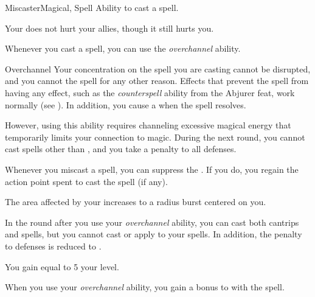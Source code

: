     \begin{feat}{Miscaster}{Magical, Spell}
        \featpre Ability to cast a spell.

         Your  does not hurt your allies, though it still hurts you.

         Whenever you cast a spell, you can use the \textit{overchannel} ability.
        \begin{ability}{Overchannel}
            Your concentration on the spell you are casting cannot be disrupted, and you cannot  the spell for any other reason.
            Effects that prevent the spell from having any effect, such as the \textit{counterspell} ability from the Abjurer feat, work normally (see ).
            In addition, you cause a  when the spell resolves.

            However, using this ability requires channeling excessive magical energy that temporarily limits your connection to magic.
            During the next round, you cannot cast spells other than , and you take a  penalty to all defenses.
        \end{ability}

         Whenever you miscast a spell, you can suppress the .
        If you do, you regain the action point spent to cast the spell (if any).

         The area affected by your  increases to a \areamed radius burst centered on you.

         In the round after you use your \textit{overchannel} ability, you can cast both cantrips and spells, but you cannot cast  or apply  to your spells.
        In addition, the penalty to defenses is reduced to .

         You gain  equal to 5 \add your level.

         When you use your \textit{overchannel} ability, you gain a  bonus to  with the spell.
    \end{feat}


